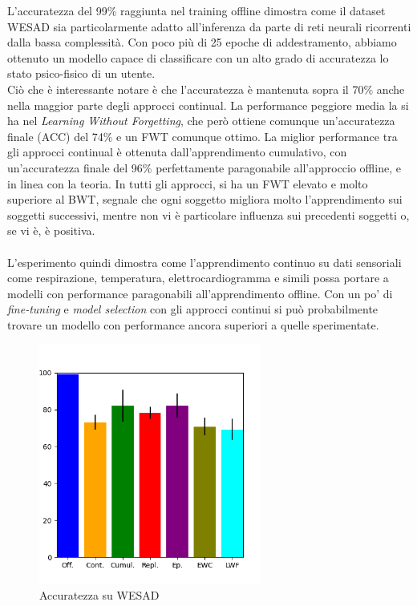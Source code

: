 L'accuratezza del 99\% raggiunta nel training offline dimostra come il dataset WESAD sia particolarmente adatto all'inferenza da parte di reti neurali ricorrenti dalla bassa complessità. Con poco più di 25 epoche di addestramento, abbiamo ottenuto un modello capace di classificare con un alto grado di accuratezza lo stato psico-fisico di un utente.\\
Ciò che è interessante notare è che l'accuratezza è mantenuta sopra il 70\% anche nella maggior parte degli approcci continual. La performance peggiore media la si ha nel \textit{Learning Without Forgetting}, che però ottiene comunque un'accuratezza finale (ACC) del 74\% e un FWT comunque ottimo. La miglior performance tra gli approcci continual è ottenuta dall'apprendimento cumulativo, con un'accuratezza finale del 96\% perfettamente paragonabile all'approccio offline, e in linea con la teoria. In tutti gli approcci, si ha un FWT elevato e molto superiore al BWT, segnale che ogni soggetto migliora molto l'apprendimento sui soggetti successivi, mentre non vi è particolare influenza sui precedenti soggetti o, se vi è, è positiva.\\\\
L'esperimento quindi dimostra come l'apprendimento continuo su dati sensoriali come respirazione, temperatura, elettrocardiogramma e simili possa portare a modelli con performance paragonabili all'apprendimento offline. Con un po' di \textit{fine-tuning} e \textit{model selection} con gli approcci continui si può probabilmente trovare un modello con performance ancora superiori a quelle sperimentate.
\begin{figure}[h]
	\begin{center}
		\includegraphics[width=0.65\textwidth]{img/graphs/wesad_final_accuracy.png}
		\caption{Accuratezza su WESAD}
		\label{fig:wesad_accuracy_graph}
	\end{center}
\end{figure}
\pagebreak
